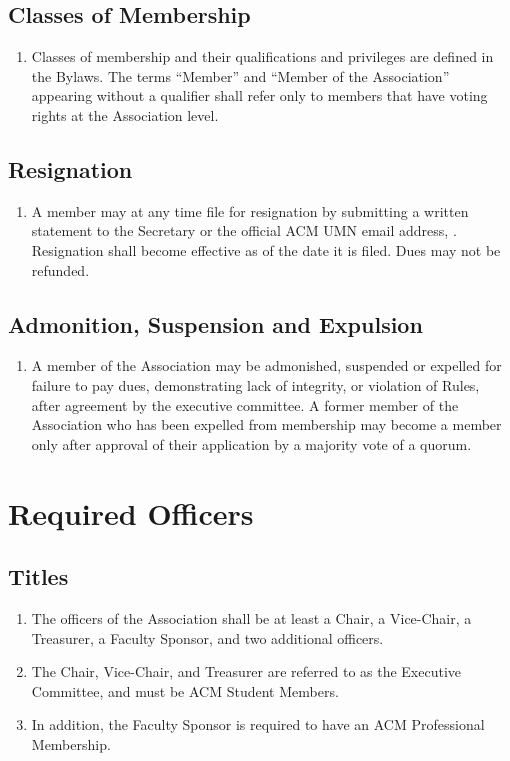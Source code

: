 \subsection{Classes of Membership}
\begin{enumerate}
	\item Classes of membership and their qualifications and privileges are defined in the Bylaws. The terms ``Member'' and ``Member of the Association'' appearing without a qualifier shall refer only to members  that have voting rights at the Association level.
\end{enumerate}

\subsection{Resignation}
\begin{enumerate}
	\item A member may at any time file for resignation by submitting a written statement to the Secretary or the official ACM UMN email address, \email. Resignation shall become effective as of the date it is filed. Dues may not be refunded.
\end{enumerate}

\subsection{Admonition, Suspension and Expulsion}
\begin{enumerate}
	\item A member of the Association may be admonished, suspended or expelled for failure to pay dues, demonstrating lack of integrity, or violation of Rules, after agreement by the executive committee. A former member of the Association who has been expelled from membership may become a member only after approval of their application by a majority vote of a quorum.
\end{enumerate}

\section{Required Officers}

\subsection{Titles}
\begin{enumerate}
	\item The officers of the Association shall be at least a Chair, a Vice-Chair, a Treasurer, a Faculty Sponsor, and two additional officers.
	\item The Chair, Vice-Chair, and Treasurer are referred to as the Executive Committee, and must be ACM Student Members.
	\item In addition, the Faculty Sponsor is required to have an ACM Professional Membership.
\end{enumerate}

